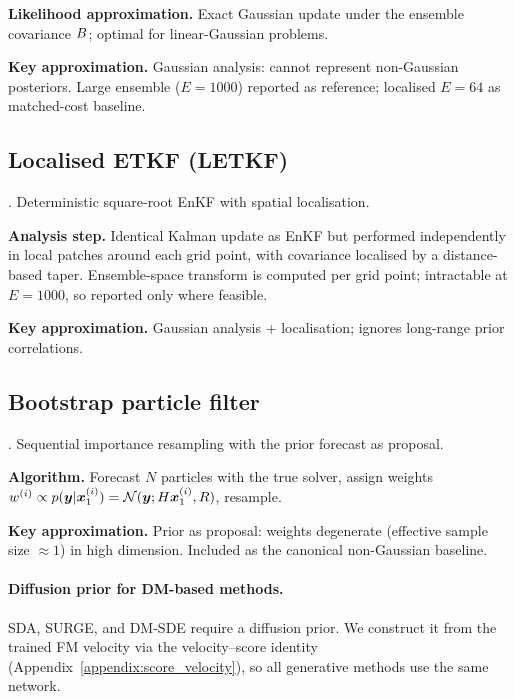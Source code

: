 \textbf{Likelihood approximation.}
Exact Gaussian update under the ensemble covariance $B$; optimal for linear-Gaussian problems.

\textbf{Key approximation.}
Gaussian analysis: cannot represent non-Gaussian posteriors.
Large ensemble ($E=1000$) reported as reference; localised $E=64$ as matched-cost baseline.

\subsection{Localised ETKF (LETKF)}\label{appendix:method:letkf}

\cite{hunt_efficient_2007}. Deterministic square-root EnKF with spatial localisation.

\textbf{Analysis step.}
Identical Kalman update as EnKF but performed independently in local patches around each grid point, with covariance localised by a distance-based taper.
Ensemble-space transform is computed per grid point; intractable at $E=1000$, so reported only where feasible.

\textbf{Key approximation.}
Gaussian analysis + localisation; ignores long-range prior correlations.

\subsection{Bootstrap particle filter}\label{appendix:method:pf}

\cite{carrassi_data_2018}. Sequential importance resampling with the prior forecast as proposal.

\textbf{Algorithm.}
Forecast $N$ particles with the true solver, assign weights $w^{(i)}\propto p(\boldsymbol{y}|\boldsymbol{x}_1^{(i)})
= \mathcal{N}(\boldsymbol{y};H\boldsymbol{x}_1^{(i)},R)$, resample.

\textbf{Key approximation.}
Prior as proposal: weights degenerate (effective sample size $\approx 1$) in high dimension.
Included as the canonical non-Gaussian baseline.

\paragraph{Diffusion prior for DM-based methods.}
SDA, SURGE, and DM-SDE require a diffusion prior.
We construct it from the trained FM velocity via the velocity--score identity (Appendix~\ref{appendix:score_velocity}),
so all generative methods use the same network.
